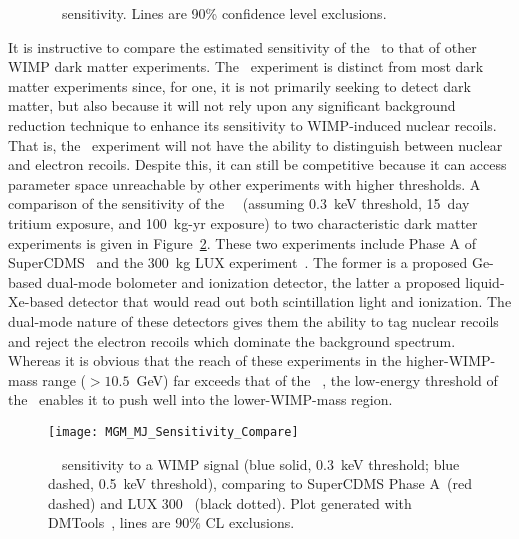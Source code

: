 			\begin{figure}
				\centering
				\def\figheight{0.4\textheight}				
				\caption[\MJ~\minmod~sensitivity to a WIMP signal]{\MJ~\minmod~sensitivity.  Lines are 90\% confidence level exclusions.}
				\label{fig:MJSensitivityToWIMP}
			\end{figure}		
	
	It is instructive to compare the estimated sensitivity of the \minmod~to that of other WIMP dark matter experiments.  The \MJ~experiment is distinct from most dark matter experiments since, for one, it is not primarily seeking to detect dark matter, but also because it will not rely upon any significant background reduction technique to enhance its sensitivity to WIMP-induced nuclear recoils.  That is, the \MJ~experiment will not have the ability to distinguish between nuclear and electron recoils.  Despite this, it can still be competitive because it can access parameter space unreachable by other experiments with higher thresholds.  A comparison of the sensitivity of the \MJ~\minmod~(assuming 0.3~keV threshold, 15~day tritium exposure, and 100~kg-yr exposure) to two characteristic dark matter experiments is given in Figure~\ref{fig:MJSensitivityToWIMPCompare}.  These two experiments include Phase A of SuperCDMS~\cite{Akerib2006411} and the 300~kg LUX experiment~\cite{LUX300}.  The former is a proposed Ge-based dual-mode bolometer and ionization detector, the latter a proposed liquid-Xe-based detector that would read out both scintillation light and ionization.  The dual-mode nature of these detectors gives them the ability to tag nuclear recoils and reject the electron recoils which dominate the background spectrum.  Whereas it is obvious that the reach of these experiments in the higher-WIMP-mass range ($>10.5$~GeV) far exceeds that of the \MJ~\minmod, the low-energy threshold of the \minmod~enables it to push well into the lower-WIMP-mass region.  
		
			\begin{figure}
				\centering
				\texttt{[image: MGM\_MJ\_Sensitivity\_Compare]}
				\caption[WIMP signal sensitivity comparison to SuperCDMS Phase A and LUX 300]
				{\MJ~\minmod~sensitivity to a WIMP signal (blue solid, 0.3~keV threshold; blue dashed, 0.5~keV threshold), comparing to SuperCDMS Phase A~\cite{Akerib2006411}(red dashed) and LUX 300~\cite{LUX300}
				(black dotted).  Plot generated with DMTools~\cite{Gai03}, lines are 90\% CL exclusions.}
				\label{fig:MJSensitivityToWIMPCompare}
			\end{figure}			
			
